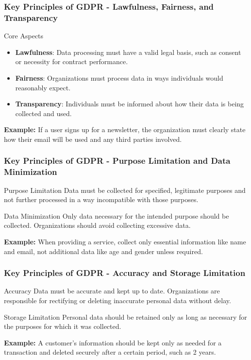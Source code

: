 \documentclass{beamer}
\begin{document}
\begin{frame}[fragile]
    \frametitle{Key Principles of GDPR - Lawfulness, Fairness, and Transparency}
    \begin{block}{Core Aspects}
        \begin{itemize}
            \item \textbf{Lawfulness}: Data processing must have a valid legal basis, such as consent or necessity for contract performance.
            \item \textbf{Fairness}: Organizations must process data in ways individuals would reasonably expect.
            \item \textbf{Transparency}: Individuals must be informed about how their data is being collected and used.
        \end{itemize}
    \end{block}
    \textbf{Example:} If a user signs up for a newsletter, the organization must clearly state how their email will be used and any third parties involved.
\end{frame}

\begin{frame}[fragile]
    \frametitle{Key Principles of GDPR - Purpose Limitation and Data Minimization}
    \begin{block}{Purpose Limitation}
        Data must be collected for specified, legitimate purposes and not further processed in a way incompatible with those purposes.
    \end{block}
    \begin{block}{Data Minimization}
        Only data necessary for the intended purpose should be collected. Organizations should avoid collecting excessive data.
    \end{block}
    \textbf{Example:} When providing a service, collect only essential information like name and email, not additional data like age and gender unless required.
\end{frame}

\begin{frame}[fragile]
    \frametitle{Key Principles of GDPR - Accuracy and Storage Limitation}
    \begin{block}{Accuracy}
        Data must be accurate and kept up to date. Organizations are responsible for rectifying or deleting inaccurate personal data without delay.
    \end{block}
    \begin{block}{Storage Limitation}
        Personal data should be retained only as long as necessary for the purposes for which it was collected. 
    \end{block}
    \textbf{Example:} A customer’s information should be kept only as needed for a transaction and deleted securely after a certain period, such as 2 years.
\end{frame}
\end{document}

